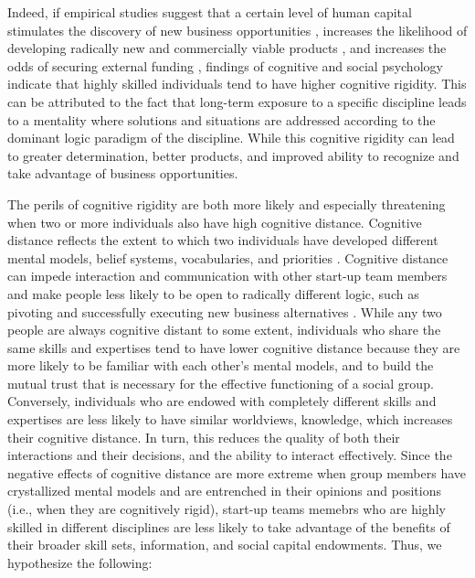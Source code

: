 \documentclass[12pt]{article}
\begin{document}
Indeed, if empirical studies suggest that a certain level of human capital stimulates the discovery of new business opportunities \citep{shane2000promise, marvel2016human}, increases the likelihood of developing radically new and commercially viable products \citep{marvel2007technology}, and increases the odds of securing external funding \citep{beckman2007early}, findings of cognitive and social psychology indicate that highly skilled individuals tend to have higher cognitive rigidity. This can be attributed to the fact that long-term exposure to a specific discipline leads to a mentality where solutions and situations are addressed according to the dominant logic paradigm of the discipline. While this cognitive rigidity can lead to greater determination, better products, and improved ability to recognize and take advantage of business opportunities.

The perils of cognitive rigidity are both more likely and especially threatening when two or more individuals also have high cognitive distance. Cognitive distance reflects the extent to which two individuals have developed different mental models, belief systems, vocabularies, and priorities \citep{nooteboom2007optimal}. Cognitive distance can impede interaction and communication with other start-up team members and make people less likely to be open to radically different logic, such as pivoting and successfully executing new business alternatives \citep{kirtley2020pivot}. While any two people are always cognitive distant to some extent, individuals who share the same skills and expertises tend to have lower cognitive distance because they are more likely to be familiar with each other’s mental models, and to build the mutual trust that is necessary for the effective functioning of a social group. Conversely, individuals who are endowed with completely different skills and expertises are less likely to have similar worldviews, knowledge, which increases their cognitive distance. In turn, this reduces the quality of both their interactions and their decisions, and the ability to interact effectively. Since the negative effects of cognitive distance are more extreme when group members have crystallized mental models and are entrenched in their opinions and positions (i.e., when they are cognitively rigid), start-up teams memebrs who are highly skilled in different disciplines are less likely to take advantage of the benefits of their broader skill sets, information, and social capital endowments. Thus, we hypothesize the following: \\
\end{document}
